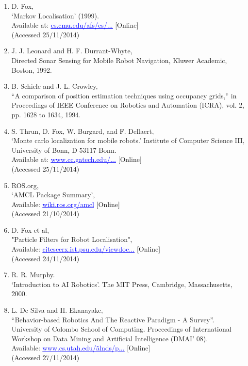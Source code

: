 \documentclass{article}
\begin{document}
\begin{enumerate}
\item D. Fox,
\\‘Markov Localisation’ (1999).
\\ Available at: \href{www.cs.cmu.edu/afs/cs/project/jair/pub/volume11/fox99a-html/node2.html}{\textcolor{blue}{\uline{cs.cmu.edu/afs/cs/...}}} [Online]
\\(Accessed 25/11/2014)

\item J. J. Leonard and H. F. Durrant-Whyte,
\\Directed Sonar Sensing for Mobile Robot Navigation, Kluwer Academic, Boston, 1992.

\item B. Schiele and J. L. Crowley,
\\“A comparison of position estimation techniques using occupancy grids,” in Proceedings of IEEE Conference on Robotics and Automation (ICRA), vol. 2, pp. 1628 to 1634, 1994.

\item S. Thrun, D. Fox, W. Burgard, and F. Dellaert, 
\\‘Monte carlo localization for mobile robots.’ Institute of Computer Science III, University of Bonn, D-53117 Bonn.
\\Available at: \href{www.cc.gatech.edu/~dellaert/pub/Dellaert99icra.pdf}{\textcolor{blue}{\uline{www.cc.gatech.edu/...}}} [Online]
\\(Accessed 25/11/2014)

\item ROS.org,
\\‘AMCL Package Summary’,
\\Available: \href{wiki.ros.org/amcl}{\textcolor{blue}{\uline{wiki.ros.org/amcl}}}  [Online]
\\(Accessed 21/10/2014)

\item D. Fox et al,
\\"Particle Filters for Robot Localisation",
\\Available: \href{citeseerx.ist.psu.edu/viewdoc...}{\textcolor{blue}{\uline{citeseerx.ist.psu.edu/viewdoc...}}} [Online]
\\(Accessed 24/11/2014)

\item R. R. Murphy.
\\‘Introduction to AI Robotics’. The MIT Press, Cambridge, Massachusetts, 2000.

\item L. De Silva and H. Ekanayake,
\\“Behavior-based Robotics And The Reactive Paradigm - A Survey”. University of Colombo School of Computing. Proceedings of International Workshop on Data Mining and Artificial Intelligence (DMAI’ 08).
\\Available: \href{www.cs.utah.edu/~alnds/papers/behavior_robotics_2008.pdf}{\textcolor{blue}{\uline{www.cs.utah.edu/\~alnds/p...}}} [Online]
\\(Accessed 27/11/2014)


\end{enumerate}
\end{document}
